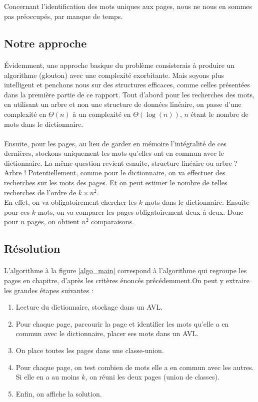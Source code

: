 \documentclass[a4paper]{article}
\begin{document}
		\subparagraph{}{
		Concernant l'identification des mots uniques aux pages, nous ne nous en sommes pas
		préoccupés, par manque de temps.
		}
	
	
		\subsection{Notre approche}
		
			\paragraph{}{
			Évidemment, une approche basique du problème consisterais à produire un algorithme (glouton) avec une complexité
			exorbitante. Mais soyons plus intelligent et penchons nous sur des structures efficaces, comme celles présentées
			dans la première partie de ce rapport. Tout d'abord pour les recherches des mots, en utilisant un arbre et non
			une structure de données linéaire, on passe d'une complexité en $\Theta(n)$ à un complexité
			en $\Theta(\log(n))$, $n$ étant le nombre de mots dans le dictionnaire.
			}
			\paragraph{}{
			Ensuite, pour les pages, au lieu de garder en mémoire l'intégralité de ces dernières, stockons 
			uniquement les mots qu'elles ont en commun avec le dictionnaire. La même question revient esnuite, structure linéaire
			ou arbre ? Arbre ! Potentiellement, comme pour le dictionnaire, on va effectuer des recherches sur les mots des pages.
			Et on peut estimer le nombre de telles recherches de l'ordre de $k \times n^{2}$. \\
			En effet, on va obligatoirement chercher les $k$ mots dans le dictionnaire. Ensuite pour ces $k$ mots, on va comparer
			les pages obligatoirement deux à deux. Donc pour $n$ pages, on obtient $n^{2}$ comparaisons.
			}

		\subsection{Résolution}
			\paragraph{}{
			L'algorithme à la figure \ref{algo_main} correspond à l'algorithme qui regroupe les
			pages en chapitre, d'après les critères énoncés précédemment.On peut y extraire 
			les grandes étapes suivantes :
			\begin{enumerate}
				\item Lecture du dictionnaire, stockage dans un AVL.
				\item Pour chaque page, parcourir la page et identifier les mots qu'elle
				a en commun avec le dictionnaire, placer ses mots dans un AVL.
				\item On place toutes les pages dans une classe-union.
				\item Pour chaque page, on test combien de mots elle a en commun avec les autres.
				Si elle en a au moins $k$, on réuni les deux pages (union de classes).
				\item Enfin, on affiche la solution.
			\end{enumerate} 
		 	}
\end{document}
